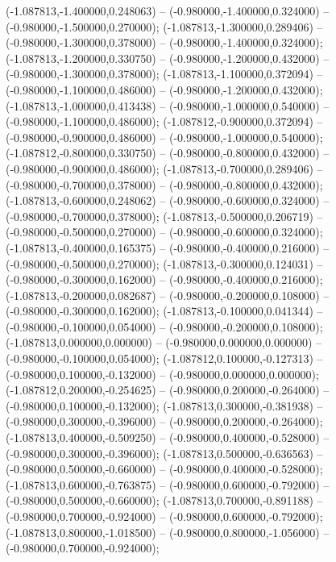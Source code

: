  (-1.087813,-1.400000,0.248063) -- (-0.980000,-1.400000,0.324000) -- (-0.980000,-1.500000,0.270000);
 (-1.087813,-1.300000,0.289406) -- (-0.980000,-1.300000,0.378000) -- (-0.980000,-1.400000,0.324000);
 (-1.087813,-1.200000,0.330750) -- (-0.980000,-1.200000,0.432000) -- (-0.980000,-1.300000,0.378000);
 (-1.087813,-1.100000,0.372094) -- (-0.980000,-1.100000,0.486000) -- (-0.980000,-1.200000,0.432000);
 (-1.087813,-1.000000,0.413438) -- (-0.980000,-1.000000,0.540000) -- (-0.980000,-1.100000,0.486000);
 (-1.087812,-0.900000,0.372094) -- (-0.980000,-0.900000,0.486000) -- (-0.980000,-1.000000,0.540000);
 (-1.087812,-0.800000,0.330750) -- (-0.980000,-0.800000,0.432000) -- (-0.980000,-0.900000,0.486000);
 (-1.087813,-0.700000,0.289406) -- (-0.980000,-0.700000,0.378000) -- (-0.980000,-0.800000,0.432000);
 (-1.087813,-0.600000,0.248062) -- (-0.980000,-0.600000,0.324000) -- (-0.980000,-0.700000,0.378000);
 (-1.087813,-0.500000,0.206719) -- (-0.980000,-0.500000,0.270000) -- (-0.980000,-0.600000,0.324000);
 (-1.087813,-0.400000,0.165375) -- (-0.980000,-0.400000,0.216000) -- (-0.980000,-0.500000,0.270000);
 (-1.087813,-0.300000,0.124031) -- (-0.980000,-0.300000,0.162000) -- (-0.980000,-0.400000,0.216000);
 (-1.087813,-0.200000,0.082687) -- (-0.980000,-0.200000,0.108000) -- (-0.980000,-0.300000,0.162000);
 (-1.087813,-0.100000,0.041344) -- (-0.980000,-0.100000,0.054000) -- (-0.980000,-0.200000,0.108000);
 (-1.087813,0.000000,0.000000) -- (-0.980000,0.000000,0.000000) -- (-0.980000,-0.100000,0.054000);
 (-1.087812,0.100000,-0.127313) -- (-0.980000,0.100000,-0.132000) -- (-0.980000,0.000000,0.000000);
 (-1.087812,0.200000,-0.254625) -- (-0.980000,0.200000,-0.264000) -- (-0.980000,0.100000,-0.132000);
 (-1.087813,0.300000,-0.381938) -- (-0.980000,0.300000,-0.396000) -- (-0.980000,0.200000,-0.264000);
 (-1.087813,0.400000,-0.509250) -- (-0.980000,0.400000,-0.528000) -- (-0.980000,0.300000,-0.396000);
 (-1.087813,0.500000,-0.636563) -- (-0.980000,0.500000,-0.660000) -- (-0.980000,0.400000,-0.528000);
 (-1.087813,0.600000,-0.763875) -- (-0.980000,0.600000,-0.792000) -- (-0.980000,0.500000,-0.660000);
 (-1.087813,0.700000,-0.891188) -- (-0.980000,0.700000,-0.924000) -- (-0.980000,0.600000,-0.792000);
 (-1.087813,0.800000,-1.018500) -- (-0.980000,0.800000,-1.056000) -- (-0.980000,0.700000,-0.924000);
